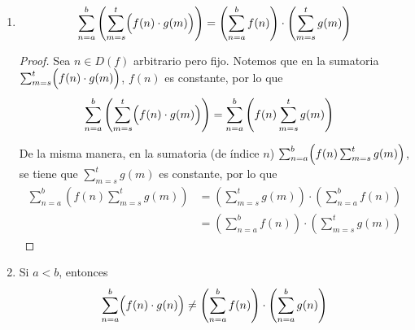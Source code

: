 \begin{enumerate}[label=\alph*)]
      
      
  
  \item \[\sum_{n=a}^{b} \left(\sum_{m=s}^{t} \Bigl(f(n) \cdot  g(m)\Bigr)\right) = \left(\sum_{n=a}^{b} f(n)\right)  \cdot \left(\sum_{m=s}^{t} g(m)\right)\]
  
  \begin{proof}\leavevmode
    Sea $n\in D(f)$ arbitrario pero fijo. Notemos que en la sumatoria $\sum_{m=s}^{t} \Bigl(f(n) \cdot  g(m)\Bigr)$, $f(n)$ es constante, por lo que
    \begin{align*}
      \sum_{n=a}^{b} \left(\sum_{m=s}^{t} \Bigl(f(n) \cdot  g(m)\Bigr)\right) &= \sum_{n=a}^{b} \left( f(n) \sum_{m=s}^{t} g(m)\right)
    \end{align*}

    De la misma manera, en la sumatoria (de índice $n$) $\sum_{n=a}^{b} \Bigl( f(n) \sum_{m=s}^{t} g(m)\Bigr)$, se tiene que $\sum_{m=s}^{t} g(m)$ es constante, por lo que
    \begin{align*}
      \sum_{n=a}^{b} \left( f(n) \sum_{m=s}^{t} g(m)\right) &= \left(\sum_{m=s}^{t} g(m)\right) \cdot \left(\sum_{n=a}^{b} f(n)\right)\\
      &= \left(\sum_{n=a}^{b} f(n)\right) \cdot \left(\sum_{m=s}^{t} g(m)\right)
    \end{align*}
  \end{proof}

  \item Si $a<b$, entonces \[\sum_{n=a}^{b} \Bigl(f(n) \cdot  g(n)\Bigr) \neq \left(\sum_{n=a}^{b} f(n)\right)  \cdot \left(\sum_{n=a}^{b} g(n)\right)\]
  

\end{enumerate}
